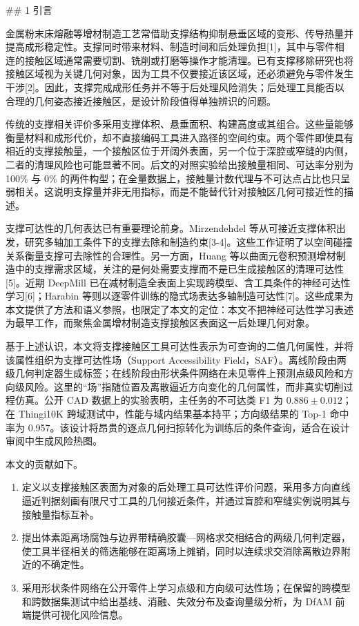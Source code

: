 ﻿\#\# 1 引言

金属粉末床熔融等增材制造工艺常借助支撑结构抑制悬垂区域的变形、传导热量并提高成形稳定性。支撑同时带来材料、制造时间和后处理负担{[}1{]}，其中与零件相连的接触区域通常需要切割、铣削或打磨等操作才能清理。已有支撑移除研究也将接触区域视为关键几何对象，因为工具不仅要接近该区域，还必须避免与零件发生干涉{[}2{]}。因此，支撑完成成形任务并不等于后处理风险消失；后处理工具能否以合理的几何姿态接近接触区，是设计阶段值得单独辨识的问题。

传统的支撑相关评价多采用支撑体积、悬垂面积、构建高度或其组合。这些量能够衡量材料和成形代价，却不直接编码工具进入路径的空间约束。两个零件即使具有相近的支撑接触量，一个接触区位于开阔外表面，另一个位于深腔或窄缝的内侧，二者的清理风险也可能显著不同。后文的对照实验给出接触量相同、可达率分别为 100\% 与 0\% 的两件构型；在全量数据上，接触量计数代理与不可达点占比也只呈弱相关。这说明支撑量并非无用指标，而是不能替代针对接触区几何可接近性的描述。

支撑可达性的几何表达已有重要理论前身。Mirzendehdel 等从可接近支撑体积出发，研究多轴加工条件下的支撑去除和制造约束{[}3-4{]}。这些工作证明了以空间碰撞关系衡量支撑可去除性的合理性。另一方面，Huang 等以曲面元卷积预测增材制造中的支撑需求区域，关注的是何处需要支撑而不是已生成接触区的清理可达性{[}5{]}。近期 DeepMill 已在减材制造全表面上实现跨模型、含工具条件的神经可达性学习{[}6{]}；Harabin 等则以逐零件训练的隐式场表达多轴制造可达性{[}7{]}。这些成果为本文提供了方法和语义参照，也限定了本文的定位：本文不把神经可达性学习表述为最早工作，而聚焦金属增材制造支撑接触区表面这一后处理几何对象。

基于上述认识，本文将支撑接触区工具可达性表示为可查询的二值几何属性，并将该属性组织为支撑可达性场（Support Accessibility Field，SAF）。离线阶段由两级几何判定器生成标签；在线阶段由形状条件网络在未见零件上预测点级风险和方向级风险。这里的``场''指随位置及离散逼近方向变化的几何属性，而非真实切削过程仿真。公开 CAD 数据上的实验表明，主任务的不可达类 F1 为 \(0.886\pm0.012\)；在 Thingi10K 跨域测试中，性能与域内结果基本持平；方向级结果的 Top-1 命中率为 0.957。该设计将昂贵的逐点几何扫掠转化为训练后的条件查询，适合在设计审阅中生成风险热图。

本文的贡献如下。

\begin{enumerate}
\def\labelenumi{\arabic{enumi}.}
\tightlist
\item
  定义以支撑接触区表面为对象的后处理工具可达性评价问题，采用多方向直线逼近判据刻画有限尺寸工具的几何接近条件，并通过盲腔和窄缝实例说明其与接触量指标互补。
\item
  提出体素距离场腐蚀与边界带精确胶囊---网格求交相结合的两级几何判定器，使工具半径相关的筛选能够在距离场上摊销，同时以连续求交消除离散边界附近的不确定性。
\item
  采用形状条件网络在公开零件上学习点级和方向级可达性场；在保留的跨模型和跨数据集测试中给出基线、消融、失效分布及查询量级分析，为 DfAM 前端提供可视化风险信息。
\end{enumerate}

